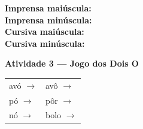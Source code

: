 \begin{consolidacao}
\begin{center}
\textbf{Imprensa mai\'uscula:} \underline{\hspace{1cm}} \underline{\hspace{1cm}} \underline{\hspace{1cm}} \underline{\hspace{1cm}} \underline{\hspace{1cm}}\\[0.5em]
\textbf{Imprensa min\'uscula:} \underline{\hspace{1cm}} \underline{\hspace{1cm}} \underline{\hspace{1cm}} \underline{\hspace{1cm}} \underline{\hspace{1cm}}\\[0.5em]
\textbf{Cursiva mai\'uscula:} \underline{\hspace{1cm}} \underline{\hspace{1cm}} \underline{\hspace{1cm}} \underline{\hspace{1cm}} \underline{\hspace{1cm}}\\[0.5em]
\textbf{Cursiva min\'uscula:} \underline{\hspace{1cm}} \underline{\hspace{1cm}} \underline{\hspace{1cm}} \underline{\hspace{1cm}} \underline{\hspace{1cm}}
\end{center}

\textbf{Atividade 3 --- Jogo dos Dois O}


\begin{center}
\begin{tabular}{ll}
av\'o \quad $\rightarrow$ \underline{\hspace{2cm}} & av\^o \quad $\rightarrow$ \underline{\hspace{2cm}} \\
p\'o \quad $\rightarrow$ \underline{\hspace{2cm}} & p\^or \quad $\rightarrow$ \underline{\hspace{2cm}} \\
n\'o \quad $\rightarrow$ \underline{\hspace{2cm}} & bolo \quad $\rightarrow$ \underline{\hspace{2cm}}
\end{tabular}
\end{center}

\end{consolidacao}

